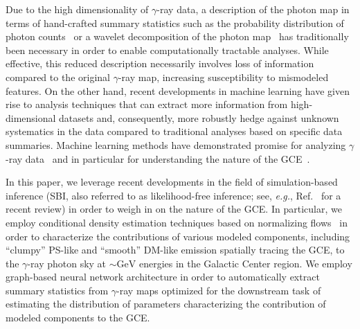 \documentclass[prd,aps,10pt,nofootinbib,twocolumn,superscriptaddress,preprintnumbers,balancelastpage,longbibliography]{revtex4-1}
\begin{document}
Due to the high dimensionality of $\gamma$-ray data, a description of the photon map in terms of hand-crafted summary statistics such as the probability distribution of photon counts~\cite{Lee:2014mza,Lee:2015fea} or a wavelet decomposition of the photon map~\cite{Bartels:2015aea,Balaji:2018rwz,McDermott:2015ydv} has traditionally been necessary in order to enable computationally tractable analyses. While effective, this reduced description necessarily involves loss of information compared to the original $\gamma$-ray map, increasing susceptibility to mismodeled features. On the other hand, recent developments in machine learning have given rise to analysis techniques that can extract more information from high-dimensional datasets and, consequently, more robustly hedge against unknown systematics in the data compared to traditional analyses based on specific data summaries. Machine learning methods have demonstrated promise for analyzing $\gamma$-ray data~\cite{Caron:2021map} and in particular for understanding the nature of the \Fermi GCE~\cite{List:2020mzd,Caron:2017udl}. 

In this paper, we leverage recent developments in the field of simulation-based inference (SBI, also referred to as likelihood-free inference; see, \emph{e.g.}, Ref.~\cite{cranmer2020frontier} for a recent review)
in order to weigh in on the nature of the GCE. In particular, we employ conditional density estimation techniques based on normalizing flows~\cite{papamakarios2019normalizing,rezende2015variational} in order to characterize the contributions of various modeled components, including ``clumpy'' PS-like and ``smooth'' DM-like emission spatially tracing the GCE, to the $\gamma$-ray photon sky at $\sim\mathrm{GeV}$ energies in the Galactic Center region. We employ graph-based neural network architecture in order to automatically extract summary statistics from $\gamma$-ray maps optimized for the downstream task of estimating the distribution of parameters characterizing the contribution of modeled components to the GCE.
\end{document}
